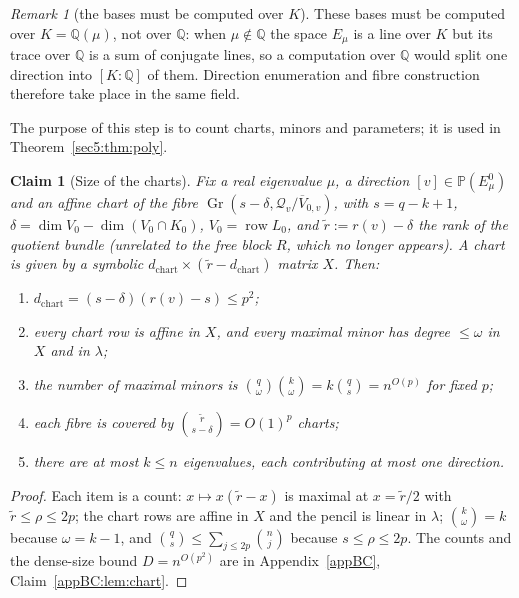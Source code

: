 \documentclass[journal]{IEEEtran}
\theoremstyle{plainn}
\newtheorem{claim}{Claim}
\theoremstyle{remark}
\newtheorem{remark}{Remark}
\newcommand{\row}{\operatorname{row}}
\newcommand{\Gr}{\operatorname{Gr}}
\begin{document}
\begin{remark}[the bases must be computed over $K$]\label{sec5:rem:sameK}
These bases must be computed over $K=\mathbb{Q}(\mu)$, not over $\mathbb{Q}$: when $\mu\notin\mathbb{Q}$
the space $E_\mu$ is a line over $K$ but its trace over $\mathbb{Q}$ is a sum of conjugate lines, so a
computation over $\mathbb{Q}$ would split one direction into $[K:\mathbb{Q}]$ of them. Direction
enumeration and fibre construction therefore take place in the same field.
\end{remark}


The purpose of this step is to count charts, minors and parameters; it is used in
Theorem~\ref{sec5:thm:poly}.

\begin{claim}[Size of the charts]\label{sec5:sub:chart}\label{sec5:lem:chart}
Fix a real eigenvalue $\mu$, a direction $[v]\in\mathbb{P}(E_\mu^0)$ and an affine chart of the fibre
$\Gr(s-\delta,\mathcal{Q}_v/\overline{V}_{0,v})$, with $s=q-k+1$,
$\delta=\dim V_0-\dim(V_0\cap K_0)$, $V_0=\row L_0$, and $\widetilde r:=r(v)-\delta$ the rank of the
quotient bundle (unrelated to the free block $R$, which no longer appears). A chart is given by a
symbolic $d_{\mathrm{chart}}\times(\widetilde r-d_{\mathrm{chart}})$ matrix $X$. Then:
\begin{enumerate}[label=(\roman*),leftmargin=*]
\item $d_{\mathrm{chart}}=(s-\delta)(r(v)-s)\le p^{2}$;
\item every chart row is affine in $X$, and every maximal minor has degree $\le\omega$ in $X$ and in
$\lambda$;
\item the number of maximal minors is $\binom{q}{\omega}\binom{k}{\omega}=k\binom{q}{s}=n^{O(p)}$ for
fixed $p$;
\item each fibre is covered by $\binom{\widetilde r}{s-\delta}=O(1)^{p}$ charts;
\item there are at most $k\le n$ eigenvalues, each contributing at most one direction.
\end{enumerate}
\end{claim}

\begin{proof}
Each item is a count: $x\mapsto x(\widetilde r-x)$ is maximal at $x=\widetilde r/2$ with
$\widetilde r\le\rho\le2p$; the chart rows are affine in $X$ and the pencil is linear in $\lambda$;
$\binom{k}{\omega}=k$ because $\omega=k-1$, and $\binom{q}{s}\le\sum_{j\le2p}\binom{n}{j}$ because
$s\le\rho\le2p$. The counts and the dense-size bound $D=n^{O(p^{2})}$ are in Appendix~\ref{appBC},
Claim~\ref{appBC:lem:chart}.
\end{proof}
\end{document}
